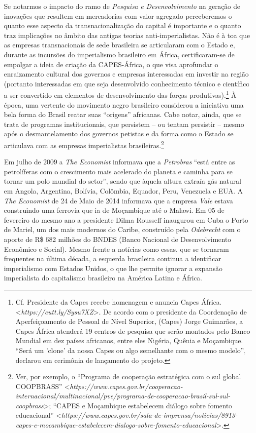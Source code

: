 Se notarmos o impacto do ramo de \emph{Pesquisa e Desenvolvimento} na
geração de inovações que resultem em mercadorias com valor agregado
perceberemos o quanto esse aspecto da transnacionalização do capital é
importante e o quanto traz implicações no âmbito das antigas teorias
anti-imperialistas. Não é à toa que as empresas transnacionais de sede
brasileira se articularam com o Estado e, durante as incursões do
imperialismo brasileiro em África, certificaram-se de empolgar a ideia
de criação da CAPES-África, o que visa aprofundar o enraizamento
cultural dos governos e empresas interessadas em investir na região
(portanto interessadas em que seja desenvolvido conhecimento técnico e
científico a ser convertido em elementos de desenvolvimento das forças
produtivas).\footnote{Cf. Presidente da Capes recebe homenagem e anuncia
  Capes África.
  \textless{}\emph{https://cutt.ly/Sysu7XZ}\textgreater{}.
  De acordo com o presidente da Coordenação de Aperfeiçoamento de
  Pessoal de Nível Superior, (Capes) Jorge Guimarães, a Capes África
  atenderá 19 centros de pesquisa que serão montados pelo Banco Mundial
  em dez países africanos, entre eles Nigéria, Quênia e Moçambique.
  ``Será um 'clone' da nossa Capes ou algo semelhante com o mesmo
  modelo'', declarou em cerimônia de lançamento do projeto.} À época,
uma vertente do movimento negro brasileiro considerou a iniciativa uma
bela forma do Brasil reatar suas ``origens'' africanas. Cabe notar,
ainda, que se trata de programas institucionais, que persistem -- ou
tentam persistir -- mesmo após o desmantelamento dos governos petistas e
da forma como o Estado se articulava com as empresas imperialistas
brasileiras.\footnote{Ver, por exemplo, o ``Programa de cooperação
  estratégica com o sul global COOPBRASS''
  \textless{}\emph{https://www.capes.gov.br/cooperacao-internacional/multinacional/pve/programa-de-cooperacao-brasil-sul-sul-coopbrass}\textgreater{};
  ``CAPES e Moçambique estabelecem diálogo sobre fomento educacional''
  \textless{}\emph{https://www.capes.gov.br/sala-de-imprensa/noticias/8913-capes-e-mocambique-estabelecem-dialogo-sobre-fomento-educacional}\textgreater{}.}

Em julho de 2009 a \emph{The Economist} informava que a \emph{Petrobras}
``está entre as petrolíferas com o crescimento mais acelerado do planeta
e caminha para se tornar um polo mundial do setor'', sendo que àquela
altura extraía gás natural em Angola, Argentina, Bolívia, Colômbia,
Equador, Peru, Venezuela e EUA. A \emph{The Economist} de 24 de Maio de
2014 informava que a empresa \emph{Vale} estava construindo uma ferrovia
que ia de Moçambique até o Malawi. Em 05 de fevereiro do mesmo ano a
presidente Dilma Rousseff inaugurou em Cuba o Porto de Mariel, um dos
mais modernos do Caribe, construído pela \emph{Odebrecht} com o aporte
de R\$ 682 milhões do BNDES (Banco Nacional de Desenvolvimento Econômico
e Social). Mesmo frente a notícias como essas, que se tornaram
frequentes na última década, a esquerda brasileira continua a
identificar imperialismo com Estados Unidos, o que lhe permite ignorar a
expansão imperialista do capitalismo brasileiro na América Latina e
África.

